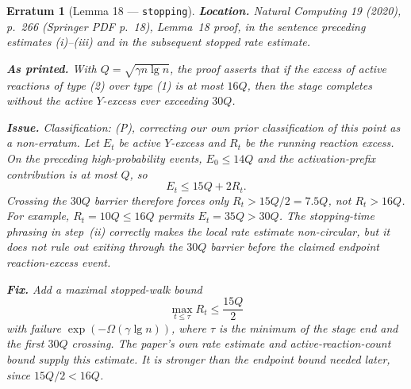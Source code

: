 \documentclass[11pt]{article}
\theoremstyle{erratumstyle}
\newtheorem{erratum}{Erratum}
\begin{document}
\begin{erratum}[Lemma 18 --- \texttt{stopping}]
\textbf{Location.} \emph{Natural Computing} 19 (2020), p.~266
(Springer PDF p.~18), Lemma~18 proof, in the sentence preceding estimates
(i)--(iii) and in the subsequent stopped rate estimate.

\medskip
\textbf{As printed.} With $Q=\sqrt{\gamma n\lg n}$, the proof asserts that if
the excess of active reactions of type (2) over type (1) is at most $16Q$, then
the stage completes without the active $Y$-excess ever exceeding $30Q$.

\medskip
\textbf{Issue.} Classification: (P), correcting our own prior classification
of this point as a non-erratum. Let $E_t$ be active $Y$-excess and $R_t$ be
the running reaction excess. On the preceding high-probability events,
$E_0\le 14Q$ and the activation-prefix contribution is at most $Q$, so
\[
  E_t \le 15Q + 2R_t.
\]
Crossing the $30Q$ barrier therefore forces only
$R_t>15Q/2=7.5Q$, not $R_t>16Q$. For example, $R_t=10Q\le16Q$ permits
$E_t=35Q>30Q$. The stopping-time phrasing in step~(ii) correctly makes the
local rate estimate non-circular, but it does not rule out exiting through the
$30Q$ barrier before the claimed endpoint reaction-excess event.

\medskip
\textbf{Fix.} Add a maximal stopped-walk bound
\[
  \max_{t\le\tau} R_t \le \frac{15Q}{2}
\]
with failure $\exp(-\Omega(\gamma\lg n))$, where $\tau$ is the minimum of the
stage end and the first $30Q$ crossing. The paper's own rate estimate and
active-reaction-count bound supply this estimate. It is stronger than the
endpoint bound needed later, since $15Q/2<16Q$.
\end{erratum}
\end{document}
